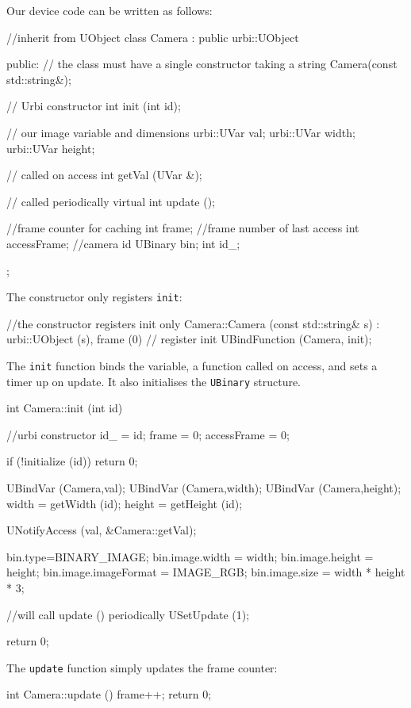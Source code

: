 Our device code can be written as follows:

\begin{cxx}
//inherit from UObject
class Camera : public urbi::UObject
{
public:
  // the class must have a single constructor taking a string
  Camera(const std::string&);

  // Urbi constructor
  int init (int id);

  // our image variable and dimensions
  urbi::UVar val;
  urbi::UVar width;
  urbi::UVar height;

  // called on access
  int getVal (UVar &);

  // called periodically
  virtual int update ();

  //frame counter for caching
  int frame;
  //frame number of last access
  int accessFrame;
  //camera id UBinary bin;
  int id_;
};
\end{cxx}

The constructor only registers \lstinline{init}:

\begin{cxx}
//the constructor registers init only
Camera::Camera (const std::string& s)
  : urbi::UObject (s),
    frame (0)
{
  // register init
  UBindFunction (Camera, init);
}
\end{cxx}

The \lstinline{init} function binds the variable, a function called on
access, and sets a timer up on update. It also initialises the
\lstinline{UBinary} structure.

\begin{cxx}
int
Camera::init (int id)
{
  //urbi constructor
  id_ = id;
  frame = 0;
  accessFrame = 0;

  if (!initialize (id))
    return 0;

  UBindVar (Camera,val);
  UBindVar (Camera,width);
  UBindVar (Camera,height);
  width = getWidth (id);
  height = getHeight (id);

  UNotifyAccess (val, &Camera::getVal);

  bin.type=BINARY_IMAGE;
  bin.image.width = width;
  bin.image.height = height;
  bin.image.imageFormat = IMAGE_RGB;
  bin.image.size = width * height * 3;

  //will call update () periodically
  USetUpdate (1);

  return 0;
}
\end{cxx}

The \lstinline{update} function simply updates the frame counter:

\begin{cxx}
int
Camera::update ()
{
  frame++;
  return 0;
}
\end{cxx}


